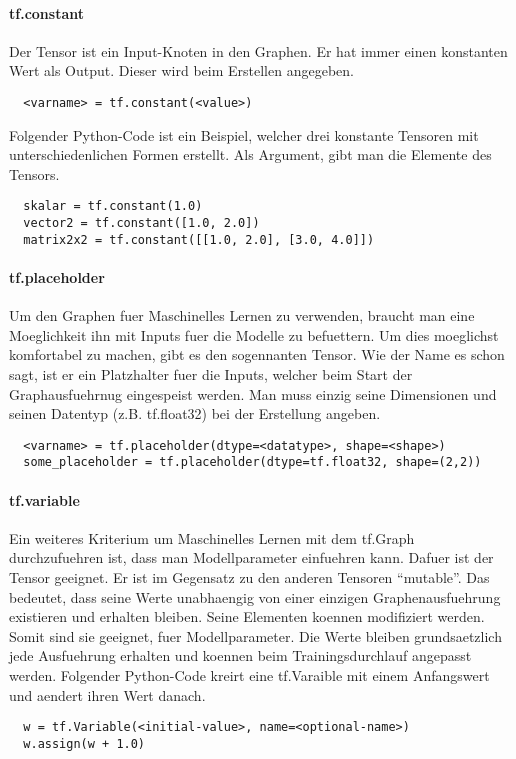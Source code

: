 \paragraph{tf.constant}
Der  Tensor ist ein Input-Knoten in den Graphen.
Er hat immer einen konstanten Wert als Output. Dieser wird beim Erstellen
angegeben.
\begin{verbatim}
  <varname> = tf.constant(<value>)
\end{verbatim}
\para{}
Folgender Python-Code ist ein Beispiel, welcher drei konstante Tensoren mit unterschiedenlichen
Formen erstellt. Als Argument, gibt man die Elemente des Tensors.
\begin{verbatim}
  skalar = tf.constant(1.0)
  vector2 = tf.constant([1.0, 2.0])
  matrix2x2 = tf.constant([[1.0, 2.0], [3.0, 4.0]])
\end{verbatim}

\paragraph{tf.placeholder}
Um den Graphen fuer Maschinelles Lernen zu verwenden, braucht man eine
Moeglichkeit ihn mit Inputs fuer die Modelle zu befuettern. Um dies moeglichst
komfortabel zu machen, gibt es den sogennanten
 Tensor. Wie der Name es schon sagt, ist er ein
Platzhalter fuer die Inputs, welcher beim Start der Graphausfuehrnug eingespeist
werden. Man muss einzig seine Dimensionen und seinen Datentyp (z.B. tf.float32) bei der Erstellung angeben.
\para{}
\begin{verbatim}
  <varname> = tf.placeholder(dtype=<datatype>, shape=<shape>)
  some_placeholder = tf.placeholder(dtype=tf.float32, shape=(2,2))
\end{verbatim}

\paragraph{tf.variable}
Ein weiteres Kriterium um Maschinelles Lernen mit dem tf.Graph durchzufuehren
ist, dass man Modellparameter einfuehren kann. Dafuer ist der
 Tensor geeignet. Er ist im Gegensatz zu den anderen
Tensoren ``mutable''. Das bedeutet, dass seine Werte unabhaengig von einer
einzigen Graphenausfuehrung existieren und erhalten bleiben. Seine Elementen
koennen modifiziert werden. Somit sind sie geeignet, fuer Modellparameter.
Die Werte bleiben grundsaetzlich jede Ausfuehrung erhalten und koennen beim
Trainingsdurchlauf angepasst werden.
\para{}
Folgender Python-Code kreirt eine tf.Varaible mit einem Anfangswert und aendert ihren Wert danach.
\begin{verbatim}
  w = tf.Variable(<initial-value>, name=<optional-name>)
  w.assign(w + 1.0)
\end{verbatim}

